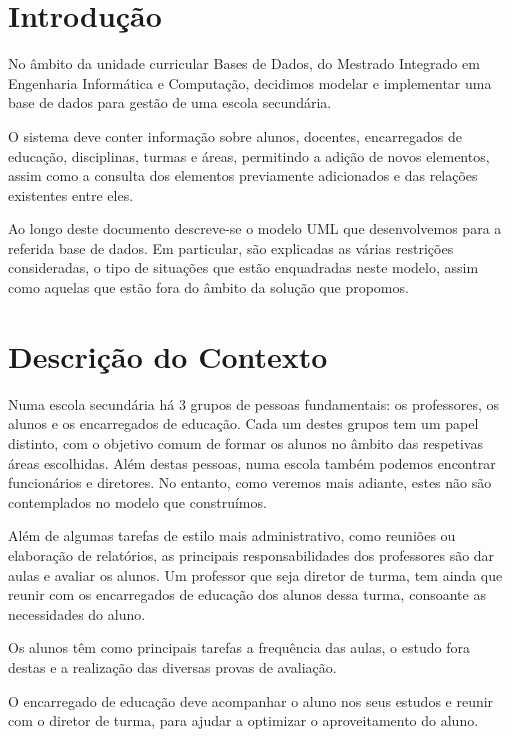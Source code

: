 \documentclass[12pt,a4paper,reqno]{report}
\numberwithin{figure}{section}
\numberwithin{equation}{section}
\begin{document}


\tableofcontents

\chapter{Introdução}

No âmbito da unidade curricular Bases de Dados, do Mestrado Integrado em Engenharia Informática e Computação, decidimos modelar e implementar uma base de dados para gestão de uma escola secundária.

O sistema deve conter informação sobre alunos, docentes, encarregados de educação, disciplinas, turmas e áreas, permitindo a adição de novos elementos, assim como a consulta dos elementos previamente adicionados e das relações existentes entre eles.

Ao longo deste documento descreve-se o modelo UML que desenvolvemos para a referida base de dados. Em particular, são explicadas as várias restrições consideradas, o tipo de situações que estão enquadradas neste modelo, assim como aquelas que estão fora do âmbito da solução que propomos.

\chapter{Descrição do Contexto}

Numa escola secundária há 3 grupos de pessoas fundamentais: os professores, os alunos e os encarregados de educação. Cada um destes grupos tem um papel distinto, com o objetivo comum de formar os alunos no âmbito das respetivas áreas escolhidas. Além destas pessoas, numa escola também podemos encontrar funcionários e diretores. No entanto, como veremos mais adiante, estes não são contemplados no modelo que construímos.

Além de algumas tarefas de estilo mais administrativo, como reuniões ou elaboração de relatórios, as principais responsabilidades dos professores são dar aulas e avaliar os alunos. Um professor que seja diretor de turma, tem ainda que reunir com os encarregados de educação dos alunos dessa turma, consoante as necessidades do aluno.

Os alunos têm como principais tarefas a frequência das aulas, o estudo fora destas e a realização das diversas provas de avaliação.

O encarregado de educação deve acompanhar o aluno nos seus estudos e reunir com o diretor de turma, para ajudar a optimizar o aproveitamento do aluno.
\end{document}
